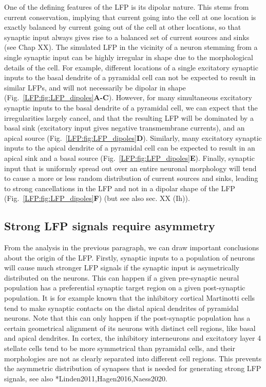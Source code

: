 One of the defining features of the LFP is its dipolar nature. This stems from current conservation, implying that current going into the cell at one location is exactly balanced by current going out of the cell at other locations, so that synaptic input always gives rise to a balanced set of current sources and sinks (see Chap XX). The simulated LFP in the vicinity of a neuron stemming from a single synaptic input can be highly irregular in shape due to the morphological details of the cell. For example, different locations of a single excitatory synaptic inputs to the basal dendrite of a pyramidal cell can not be expected to result in similar LFPs, and will not necessarily be dipolar in shape (Fig.~\ref{LFP:fig:LFP_dipoles}{\bf A-C}). However, for many simultaneous excitatory synaptic inputs to the basal dendrite of a pyramidal cell, we can expect that the irregularities largely cancel, and that the resulting LFP will be dominated by a basal sink (excitatory input gives negative transmembrane currents), and an apical source (Fig.~\ref{LFP:fig:LFP_dipoles}{\bf D}). Similarly, many excitatory synaptic inputs to the apical dendrite of a pyramidal cell can be expected to result in an apical sink and a basal source (Fig.~\ref{LFP:fig:LFP_dipoles}{\bf E}). Finally, synaptic input that is uniformly spread out over an entire neuronal morphology will tend to cause a more or less random distribution of current sources and sinks, leading to strong cancellations in the LFP and not in a dipolar shape of the LFP (Fig.~\ref{LFP:fig:LFP_dipoles}{\bf F}) (but see also sec. XX (Ih)). 



\subsection{Strong LFP signals require asymmetry}
From the analysis in the previous paragraph, we can draw important conclusions about the origin of the LFP. 			
Firstly, synaptic inputs to a population of neurons will cause much stronger LFP signals if the synaptic input is asymetrically distributed on the neurons. 
This can happen if a given pre-synaptic neural population has a preferential synaptic target region on a given post-synaptic population. It is for example known that the inhibitory cortical Martinotti cells tend to make synaptic contacts on the distal apical dendrites of pyramidal neurons. 
Note that this can only happen if the post-synaptic population has a certain geometrical alignment of its neurons with distinct cell regions, like basal and apical dendrites. In cortex, the inhibitory interneurons and excitatory layer 4 stellate cells tend to be more symmetrical than pyramidal cells, and their morphologies are not as clearly separated into different cell regions. This prevents the asymmetric distribution of synapses that is needed for generating strong LFP signals, see also \citeasnoun**{Linden2011,Hagen2016,Naess2020}.

